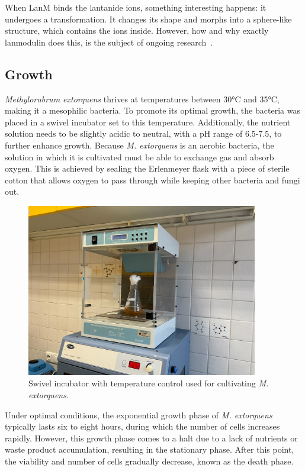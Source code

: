 When LanM binds the lantanide ions, something interesting happens: it undergoes a transformation.
It changes its shape and morphs into a sphere-like structure, which contains the ions inside.
However, how and why exactly lanmodulin does this, is the subject of ongoing research~\cite{lanmongoingresearch}.

\subsection{Growth\authorB}
\emph{Methylorubrum extorquens} thrives at temperatures between 30°C and 35°C, making it a
mesophilic bacteria.
To promote its optimal growth, the bacteria was placed in a swivel
incubator set to this temperature.
Additionally, the nutrient solution needs to be slightly acidic to neutral, with a pH range of 6.5-7.5, to further enhance growth.
Because \emph{M. extorquens} is an aerobic bacteria, the solution in which it is cultivated must be able to exchange gas and absorb oxygen.
This is achieved by sealing the Erlenmeyer flask with a piece of sterile cotton that allows oxygen to pass through while keeping other bacteria and fungi out.

\begin{figure}[H]
    \centering
    \includegraphics[width=0.9\textwidth]{./media/images/swivel_incubator}
    \caption{Swivel incubator with temperature control used for cultivating \emph{M. extorquens}.}
    \label{fig:swivel_incubator}
\end{figure}

Under optimal conditions, the exponential growth phase of \emph{M. extorquens} typically lasts six to eight hours, during which the number of cells increases rapidly.
However, this growth phase comes to a halt due to a lack of nutrients or waste product accumulation, resulting in the stationary phase.
After this point, the viability and number of cells gradually decrease, known as the death phase.


